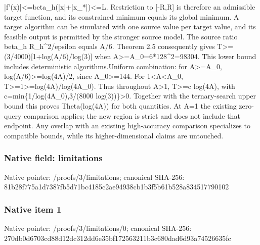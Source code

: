 \documentclass[10pt,a4paper]{article}
\begin{document}
|f'(x)|<=\allowbreak{}beta\_\allowbreak{}h(|x|+|x\_\allowbreak{}*|)<=\allowbreak{}L. Restriction to [-R,\allowbreak{}R] is therefore an admissible target function,\allowbreak{} and its constrained minimum equals its global minimum. A target algorithm can be simulated with one source value per target value,\allowbreak{} and its feasible output is permitted by the stronger source model. The source ratio beta\_\allowbreak{}h R\_\allowbreak{}h\textasciicircum{}2/\allowbreak{}epsilon equals A/\allowbreak{}6. Theorem 2.5 consequently gives T>=\allowbreak{}(3/\allowbreak{}4000)[1+log(A/\allowbreak{}6)/\allowbreak{}log(3)] when A>=\allowbreak{}A\_\allowbreak{}0=\allowbreak{}6*128\textasciicircum{}2=\allowbreak{}98304. This lower bound includes deterministic algorithms.\newline{}\newline{}Uniform combination:\allowbreak{} for A>=\allowbreak{}A\_\allowbreak{}0,\allowbreak{} log(A/\allowbreak{}6)>=\allowbreak{}log(4A)/\allowbreak{}2,\allowbreak{} since A\_\allowbreak{}0>=\allowbreak{}144. For 1<A<A\_\allowbreak{}0,\allowbreak{} T>=\allowbreak{}1>=\allowbreak{}log(4A)/\allowbreak{}log(4A\_\allowbreak{}0). Thus throughout A>1,\allowbreak{} T>=\allowbreak{}c log(4A),\allowbreak{} with c=\allowbreak{}min\{1/\allowbreak{}log(4A\_\allowbreak{}0),\allowbreak{}3/\allowbreak{}(8000 log(3))\}>0. Together with the ternary-search upper bound this proves Theta(log(4A)) for both quantities. At A=\allowbreak{}1 the existing zero-query comparison applies;\allowbreak{} the new region is strict and does not include that endpoint. Any overlap with an existing high-accuracy comparison specializes to compatible bounds,\allowbreak{} while its higher-dimensional claims are untouched.\par\endgroup

\subsubsection{Native field: limitations}
Native pointer: /proofs/3/limitations; canonical SHA-256: 81b28f775a1d7387fb5d71bc4185c2ae94938cb1b3f5b61b528a834517790102

\subsubsection{Native item 1}
Native pointer: /proofs/3/limitations/0; canonical SHA-256: 270db0d6703cd88d12dc312dd6e35bf172563211b3c680dad6d93a74526635fc
\end{document}
